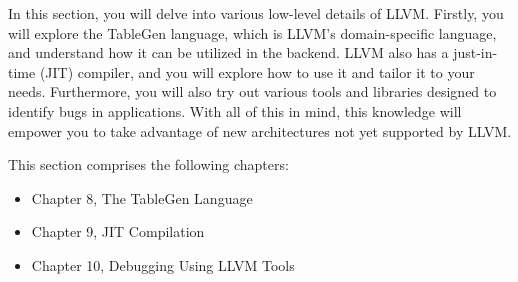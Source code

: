 In this section, you will delve into various low-level details of LLVM. Firstly, you will explore the TableGen language, which is LLVM’s domain-specific language, and understand how it can be utilized in the backend. LLVM also has a just-in-time (JIT) compiler, and you will explore how to use it and tailor it to your needs. Furthermore, you will also try out various tools and libraries designed to identify bugs in applications. With all of this in mind, this knowledge will empower you to take advantage of new architectures not yet supported by LLVM.

This section comprises the following chapters:

\begin{itemize}
\item
Chapter 8, The TableGen Language

\item
Chapter 9, JIT Compilation

\item
Chapter 10, Debugging Using LLVM Tools
\end{itemize}